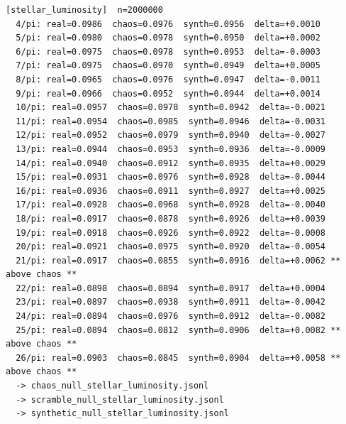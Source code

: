 \documentclass[11pt, letterpaper, openany]{book}
\begin{document}
\begin{empiricalbox}
\begin{lstlisting}[style=terminal]
[stellar_luminosity]  n=2000000
  4/pi: real=0.0986  chaos=0.0976  synth=0.0956  delta=+0.0010
  5/pi: real=0.0980  chaos=0.0978  synth=0.0950  delta=+0.0002
  6/pi: real=0.0975  chaos=0.0978  synth=0.0953  delta=-0.0003
  7/pi: real=0.0975  chaos=0.0970  synth=0.0949  delta=+0.0005
  8/pi: real=0.0965  chaos=0.0976  synth=0.0947  delta=-0.0011
  9/pi: real=0.0966  chaos=0.0952  synth=0.0944  delta=+0.0014
  10/pi: real=0.0957  chaos=0.0978  synth=0.0942  delta=-0.0021
  11/pi: real=0.0954  chaos=0.0985  synth=0.0946  delta=-0.0031
  12/pi: real=0.0952  chaos=0.0979  synth=0.0940  delta=-0.0027
  13/pi: real=0.0944  chaos=0.0953  synth=0.0936  delta=-0.0009
  14/pi: real=0.0940  chaos=0.0912  synth=0.0935  delta=+0.0029
  15/pi: real=0.0931  chaos=0.0976  synth=0.0928  delta=-0.0044
  16/pi: real=0.0936  chaos=0.0911  synth=0.0927  delta=+0.0025
  17/pi: real=0.0928  chaos=0.0968  synth=0.0928  delta=-0.0040
  18/pi: real=0.0917  chaos=0.0878  synth=0.0926  delta=+0.0039
  19/pi: real=0.0918  chaos=0.0926  synth=0.0922  delta=-0.0008
  20/pi: real=0.0921  chaos=0.0975  synth=0.0920  delta=-0.0054
  21/pi: real=0.0917  chaos=0.0855  synth=0.0916  delta=+0.0062 ** above chaos **
  22/pi: real=0.0898  chaos=0.0894  synth=0.0917  delta=+0.0004
  23/pi: real=0.0897  chaos=0.0938  synth=0.0911  delta=-0.0042
  24/pi: real=0.0894  chaos=0.0976  synth=0.0912  delta=-0.0082
  25/pi: real=0.0894  chaos=0.0812  synth=0.0906  delta=+0.0082 ** above chaos **
  26/pi: real=0.0903  chaos=0.0845  synth=0.0904  delta=+0.0058 ** above chaos **
  -> chaos_null_stellar_luminosity.jsonl
  -> scramble_null_stellar_luminosity.jsonl
  -> synthetic_null_stellar_luminosity.jsonl


\end{lstlisting}
\end{empiricalbox}
\end{document}
